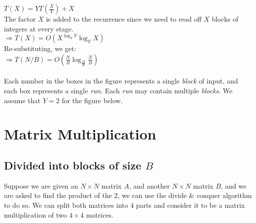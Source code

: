\documentclass{article}
\begin{document}
$T(X) = YT(\frac{X}{Y}) + X$\\
The factor $X$ is added to the recurrence since we need to read off
$X$ blocks of integers at every stage.\\
$\Rightarrow T(X) = O(X^{\log_Y{Y}}\log_Y{X})$\\
Re-substituting, we get:\\
$\Rightarrow T(N/B) = O(\frac{N}{B}\log_{\frac{M}{B}}{\frac{N}{B}})$\\
\\
Each number in the boxes in the figure represents a single
\textit{block} of input, and each box represents a single
\textit{run}. Each \textit{run} may contain multiple
\textit{blocks}. We assume that $Y = 2$ for the figure below.

\begin{center}
\end{center}


\clearpage


\section{Matrix Multiplication}

\subsection{Divided into blocks of size $B$}

Suppose we are given an $N \times N$ matrix $A$, and another $N \times
N$ matrix $B$, and we are asked to find the product of the 2, we can
use the divide \& conquer algorithm to do so. We can split both
matrices into 4 parts and consider it to be a matrix multiplication of
two $4 \times 4$ matrices.
\end{document}

